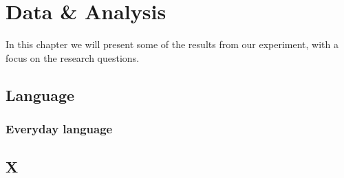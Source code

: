 \chapter{Data \& Analysis}
In this chapter we will present some of the results from our experiment, with a focus on the research questions. 


\section{Language}



\subsection{Everyday language}


\section{X}

